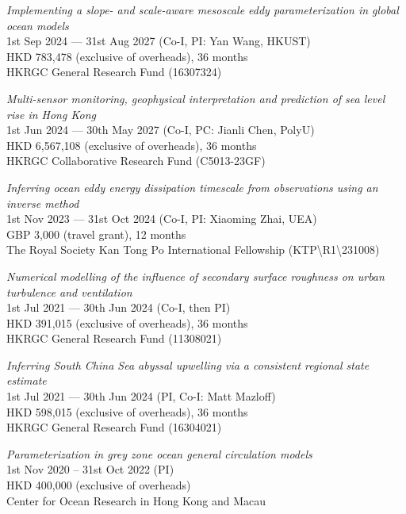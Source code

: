 \documentclass[letterpaper]{article}
\renewenvironment{itemize}{
  \begin{list}{}{
    \setlength{\leftmargin}{1.5em}
  }
}{
  \end{list}
}
\begin{document}
\begin{itemize}
\item[--] \textit{Implementing a slope- and scale-aware mesoscale eddy parameterization in global ocean models}\\
1st Sep 2024 --- 31st Aug 2027 (Co-I, PI: Yan Wang, HKUST)\\
HKD 783,478 (exclusive of overheads), 36 months\\
HKRGC General Research Fund (16307324)

\item[--] \textit{Multi-sensor monitoring, geophysical interpretation and prediction of sea level rise in Hong Kong}\\
1st Jun 2024 --- 30th May 2027 (Co-I, PC: Jianli Chen, PolyU)\\
HKD 6,567,108 (exclusive of overheads), 36 months\\
HKRGC Collaborative Research Fund (C5013-23GF)

\item[--] \textit{Inferring ocean eddy energy dissipation timescale from observations using an inverse method}\\
1st Nov 2023 --- 31st Oct 2024 (Co-I, PI: Xiaoming Zhai, UEA)\\
GBP 3,000 (travel grant), 12 months\\
The Royal Society Kan Tong Po International Fellowship (KTP\textbackslash R1\textbackslash 231008)

\item[--] \textit{Numerical modelling of the influence of secondary surface roughness on urban turbulence and ventilation}\\
1st Jul 2021 --- 30th Jun 2024 (Co-I, then PI)\\
HKD 391,015 (exclusive of overheads), 36 months\\
HKRGC General Research Fund (11308021)

\item[--] \textit{Inferring South China Sea abyssal upwelling via a consistent regional state estimate}\\
1st Jul 2021 --- 30th Jun 2024 (PI, Co-I: Matt Mazloff)\\
HKD 598,015 (exclusive of overheads), 36 months\\
HKRGC General Research Fund (16304021)

\item[--] \textit{Parameterization in grey zone ocean general circulation models}\\
1st Nov 2020 -- 31st Oct 2022 (PI)\\
HKD 400,000 (exclusive of overheads)\\
Center for Ocean Research in Hong Kong and Macau


\end{itemize}
\end{document}
